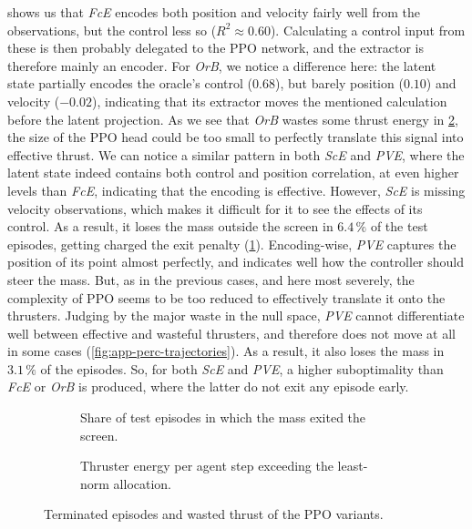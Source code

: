  shows us that \emph{FcE} encodes both position and
velocity fairly well from the observations, but the control less so ($R^2 \approx 0.60$).
Calculating a control input from these is then probably delegated to the PPO network, and the extractor is therefore mainly an encoder.
For \emph{OrB}, we notice a difference here: the latent state partially encodes the oracle's control ($0.68$),
but barely position ($0.10$) and velocity ($-0.02$), indicating that its extractor moves the mentioned calculation before the latent projection.
As we see that \emph{OrB} wastes some thrust energy in \cref{fig:perc-null-waste}, the size of the PPO head could be too small to perfectly
translate this signal into effective thrust. We can notice a similar pattern in both \emph{ScE} and \emph{PVE}, where
the latent state indeed contains both control and position correlation, at even higher levels than \emph{FcE},
indicating that the encoding is effective. However, \emph{ScE} is missing velocity observations, which makes it
difficult for it to see the effects of its control. As a result, it loses the mass outside the screen in $6.4\,\%$
of the test episodes, getting charged the exit penalty (\cref{fig:perc-off-screen}).
Encoding-wise, \emph{PVE} captures the position of its point almost perfectly, and
indicates well how the controller should steer the mass. But, as in the previous cases, and here most
severely, the complexity of PPO seems to be too reduced to effectively translate it onto the thrusters. Judging
by the major waste in the null space, \emph{PVE} cannot differentiate well between effective and wasteful
thrusters, and therefore does not move at all in some cases (\cref{fig:app-perc-trajectories}). As a result, it also
loses the mass in $3.1\,\%$ of the episodes. So, for both \emph{ScE} and \emph{PVE}, a higher suboptimality
than \emph{FcE} or \emph{OrB} is produced, where the latter do not exit any episode early.



\begin{figure}[htbp]
  \centering
  \begin{subfigure}[t]{0.49\linewidth}
    \centering
    \caption{Share of test episodes in which the mass exited the screen.}
    \label{fig:perc-off-screen}
  \end{subfigure}\hfill
  \begin{subfigure}[t]{0.49\linewidth}
    \centering
    \caption{Thruster energy per agent step exceeding the least-norm allocation.}
    \label{fig:perc-null-waste}
  \end{subfigure}
  \caption{Terminated episodes and wasted thrust of the PPO variants.}
  \label{fig:perc-off-screen-waste}
\end{figure}

